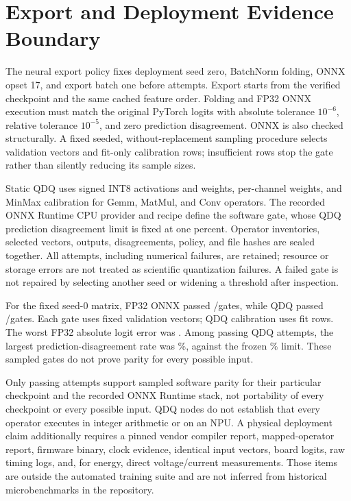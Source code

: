 \documentclass[10pt,conference]{IEEEtran}
\begin{document}
\section{Export and Deployment Evidence Boundary}

The neural export policy fixes deployment seed zero, BatchNorm folding, ONNX
opset 17, and export batch one before attempts. Export starts from the verified
checkpoint and the same cached feature order. Folding and FP32 ONNX execution
must match the original PyTorch logits with absolute tolerance $10^{-6}$,
relative tolerance $10^{-5}$, and zero prediction disagreement. ONNX is also
checked structurally. A fixed seeded, without-replacement sampling procedure
selects validation vectors and fit-only calibration rows; insufficient rows
stop the gate rather than silently reducing its sample sizes.

Static QDQ uses signed INT8 activations and weights, per-channel weights, and
MinMax calibration for Gemm, MatMul, and Conv operators. The recorded ONNX
Runtime CPU provider and recipe define the software gate, whose QDQ prediction
disagreement limit is fixed at one percent. Operator inventories, selected
vectors, outputs, disagreements, policy, and file hashes are sealed together.
All attempts, including numerical failures, are retained; resource or storage
errors are not treated as scientific quantization failures. A failed gate is
not repaired by selecting another seed or widening a threshold after inspection.

For the fixed seed-0 matrix, FP32 ONNX passed
\vExportFpPassed/\vExportFpTotal gates, while QDQ passed
\vExportQdqPassed/\vExportQdqTotal gates. Each gate uses
\vExportValidationVectors fixed validation vectors; QDQ calibration uses
\vExportCalibrationRows fit rows. The worst FP32 absolute logit error was
\vExportFpWorstAbsError. Among passing QDQ attempts, the largest
prediction-disagreement rate was
\vExportQdqWorstPassedDisagreementPct\%, against the frozen
\vExportQdqLimitPct\% limit. These sampled gates do not prove parity for
every possible input.

Only passing attempts support sampled software parity for their particular
checkpoint and the recorded ONNX Runtime stack, not portability of every
checkpoint or every possible input. QDQ nodes do not establish that every
operator executes in integer arithmetic or
on an NPU. A physical deployment claim additionally requires a pinned vendor
compiler report, mapped-operator report, firmware binary, clock evidence,
identical input vectors, board logits, raw timing logs, and, for energy, direct
voltage/current measurements. Those items are outside the automated training
suite and are not inferred from historical microbenchmarks in the repository.
\end{document}
